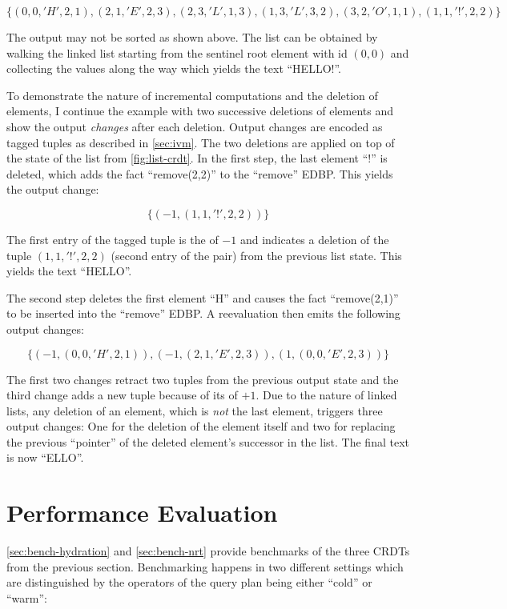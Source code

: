 \[\{ (0,0,'H',2,1), (2,1,'E',2,3), (2,3,'L',1,3), (1,3,'L',3,2), (3,2,'O',1,1), (1,1,'!',2,2) \}\]

The output may not be sorted as shown above.
The list can be obtained by walking the linked list starting from
the sentinel root element with id \((0, 0)\) and collecting the values along
the way which yields the text ``HELLO!''.

To demonstrate the nature of incremental computations and the deletion of elements,
I continue the example with two successive deletions of elements and show
the output \emph{changes} after each deletion.
Output changes are encoded as tagged tuples as described in \ref{sec:ivm}.
The two deletions are applied on top of the state of the list from \ref{fig:list-crdt}.
In the first step, the last element ``!'' is deleted, which adds the fact
``remove(2,2)'' to the ``remove'' \ac{EDBP}. This yields the output change:

\[\{ (-1, (1,1,'!',2,2)) \}\]

The first entry of the tagged tuple is the \zweight{} of \(-1\) and indicates
a deletion of the tuple \((1, 1, '!', 2, 2)\) (second entry of the pair)
from the previous list state.
This yields the text ``HELLO''.

The second step deletes the first element ``H'' and causes the fact
``remove(2,1)'' to be inserted into the ``remove'' \ac{EDBP}.
A reevaluation then emits the following output changes:

\[\{
(-1, (0, 0, 'H', 2, 1)),
(-1, (2, 1, 'E', 2, 3)),
( 1, (0, 0, 'E', 2, 3))
\}\]

The first two changes retract two tuples from the previous output state and the
third change adds a new tuple because of its \zweight{} of \(+1\).
Due to the nature of linked lists, any deletion of an element, which is \emph{not}
the last element, triggers three output changes: One for the deletion of the element
itself and two for replacing the previous ``pointer'' of the deleted element's
successor in the list.
The final text is now ``ELLO''.

\section{Performance Evaluation}\label{sec:benchmarks}

\ref{sec:bench-hydration} and \ref{sec:bench-nrt}
provide benchmarks of the three \acp{CRDT} from the previous section.
Benchmarking happens in two different settings which are distinguished by
the operators of the query plan being either ``cold'' or ``warm'':

